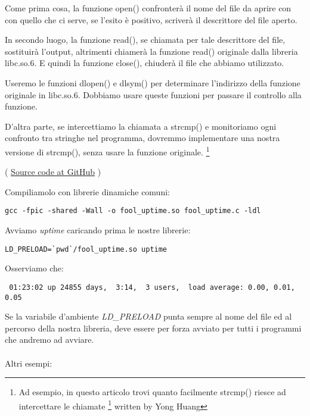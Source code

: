 Come prima cosa, la funzione open() confronterà il nome del file da aprire con con quello che ci serve,
se l'esito è positivo, scriverà il descrittore del file aperto.

In secondo luogo, la funzione read(), se chiamata per tale descrittore del file, sostituirà l'output, altrimenti chiamerà 
la funzione read() originale dalla libreria libc.so.6.
E quindi la funzione close(), chiuderà il file che abbiamo utilizzato.


Useremo le funzioni dlopen() e dlsym() per determinare l'indirizzo della funzione originale in libc.so.6.
Dobbiamo usare queste funzioni per passare il controllo alla  funzione.


D'altra parte, se intercettiamo la chiamata a strcmp() e monitoriamo ogni confronto tra stringhe
nel programma, dovremmo implementare una nostra versione di strcmp(), senza usare la funzione originale.
\footnote{Ad esempio, in questo articolo trovi quanto facilmente strcmp() riesce ad intercettare le chiamate
\footnote{\href{http://go.yurichev.com/17143}{yurichev.com}}
written by Yong Huang}


( \href{\GitHubBlobMasterURL/OS/LD_PRELOAD/fool_uptime.c}{Source code at GitHub} )

Compiliamolo con librerie dinamiche comuni:

\begin{lstlisting}
gcc -fpic -shared -Wall -o fool_uptime.so fool_uptime.c -ldl
\end{lstlisting}

Avviamo \emph{uptime} caricando prima le nostre librerie:

\begin{lstlisting}
LD_PRELOAD=`pwd`/fool_uptime.so uptime
\end{lstlisting}

Osserviamo che:

\begin{lstlisting}
 01:23:02 up 24855 days,  3:14,  3 users,  load average: 0.00, 0.01, 0.05
\end{lstlisting}

Se la variabile d'ambiente \emph{LD\_PRELOAD} punta sempre al nome del file ed al percorso della nostra libreria, 
deve essere per forza avviato per tutti i programmi che andremo ad avviare. \\
\\
Altri esempi:


